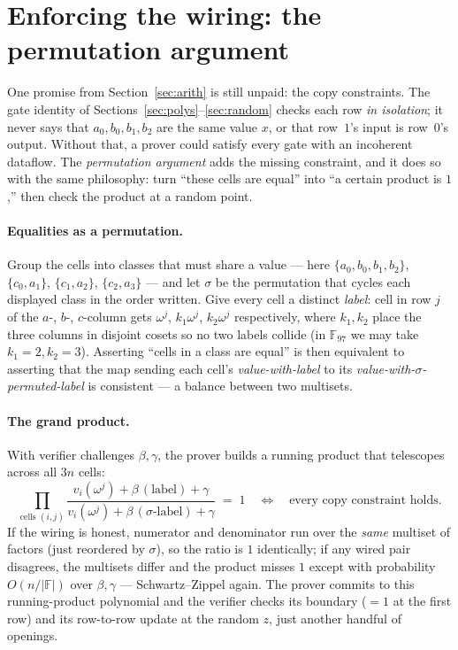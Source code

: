 \documentclass[11pt,a4paper]{article}
\theoremstyle{definition}
\newcommand{\F}{\mathbb{F}}
\begin{document}
\section{Enforcing the wiring: the permutation argument}\label{sec:perm}

One promise from Section~\ref{sec:arith} is still unpaid: the copy constraints.
The gate identity of Sections~\ref{sec:polys}--\ref{sec:random} checks each row
\emph{in isolation}; it never says that $a_0, b_0, b_1, b_2$ are the same value
$x$, or that row~$1$'s input is row~$0$'s output. Without that, a prover could
satisfy every gate with an incoherent dataflow. The \emph{permutation argument}
adds the missing constraint, and it does so with the same philosophy: turn
``these cells are equal'' into ``a certain product is $1$,'' then check the
product at a random point.

\paragraph{Equalities as a permutation.} Group the cells into classes that must
share a value --- here $\{a_0, b_0, b_1, b_2\}$, $\{c_0, a_1\}$,
$\{c_1, a_2\}$, $\{c_2, a_3\}$ --- and let $\sigma$ be the permutation that
cycles each displayed class in the order written. Give every cell a distinct
\emph{label}: cell in row $j$ of
the $a$-, $b$-, $c$-column gets $\omega^j$, $k_1\omega^j$, $k_2\omega^j$
respectively, where $k_1, k_2$ place the three columns in disjoint cosets so no
two labels collide (in $\F_{97}$ we may take $k_1 = 2, k_2 = 3$). Asserting
``cells in a class are equal'' is then equivalent to asserting that the map
sending each cell's \emph{value-with-label} to its \emph{value-with-$\sigma$-permuted-label}
is consistent --- a balance between two multisets.

\paragraph{The grand product.} With verifier challenges $\beta, \gamma$, the
prover builds a running product that telescopes across all $3n$ cells:
\[
\prod_{\text{cells } (i,j)}
\frac{v_{i}(\omega^j) + \beta\,(\text{label}) + \gamma}
     {v_{i}(\omega^j) + \beta\,(\text{$\sigma$-label}) + \gamma}
\;=\; 1
\quad\Longleftrightarrow\quad
\text{every copy constraint holds.}
\]
If the wiring is honest, numerator and denominator run over the \emph{same}
multiset of factors (just reordered by $\sigma$), so the ratio is $1$ identically;
if any wired pair disagrees, the multisets differ and the product misses $1$
except with probability $O(n/|\F|)$ over $\beta, \gamma$ --- Schwartz--Zippel
again. The prover commits to this running-product polynomial and the verifier
checks its boundary ($=1$ at the first row) and its row-to-row update at the
random $z$, just another handful of openings.
\end{document}
